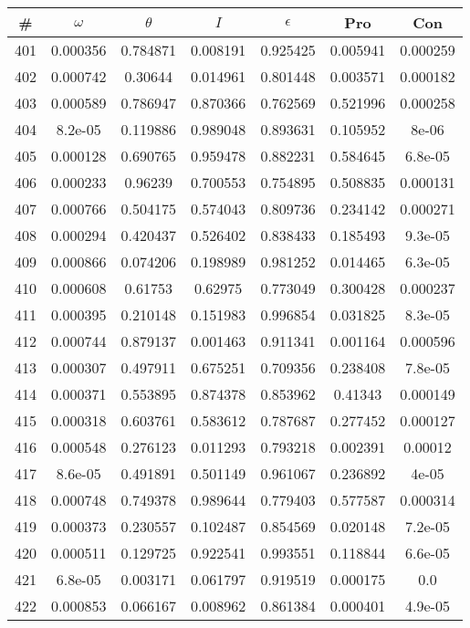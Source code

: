 \newpage
\begin{table}
\begin{tabular}{c|c|c|c|c|c|c}
\# & $\omega$ & $\theta$ & $I$ & $\epsilon$ & Pro & Con\\
\hline
401 & 0.000356 & 0.784871 & 0.008191 & 0.925425 & 0.005941 & 0.000259\\
402 & 0.000742 & 0.30644 & 0.014961 & 0.801448 & 0.003571 & 0.000182\\
403 & 0.000589 & 0.786947 & 0.870366 & 0.762569 & 0.521996 & 0.000258\\
404 & 8.2e-05 & 0.119886 & 0.989048 & 0.893631 & 0.105952 & 8e-06\\
405 & 0.000128 & 0.690765 & 0.959478 & 0.882231 & 0.584645 & 6.8e-05\\
406 & 0.000233 & 0.96239 & 0.700553 & 0.754895 & 0.508835 & 0.000131\\
407 & 0.000766 & 0.504175 & 0.574043 & 0.809736 & 0.234142 & 0.000271\\
408 & 0.000294 & 0.420437 & 0.526402 & 0.838433 & 0.185493 & 9.3e-05\\
409 & 0.000866 & 0.074206 & 0.198989 & 0.981252 & 0.014465 & 6.3e-05\\
410 & 0.000608 & 0.61753 & 0.62975 & 0.773049 & 0.300428 & 0.000237\\
411 & 0.000395 & 0.210148 & 0.151983 & 0.996854 & 0.031825 & 8.3e-05\\
412 & 0.000744 & 0.879137 & 0.001463 & 0.911341 & 0.001164 & 0.000596\\
413 & 0.000307 & 0.497911 & 0.675251 & 0.709356 & 0.238408 & 7.8e-05\\
414 & 0.000371 & 0.553895 & 0.874378 & 0.853962 & 0.41343 & 0.000149\\
415 & 0.000318 & 0.603761 & 0.583612 & 0.787687 & 0.277452 & 0.000127\\
416 & 0.000548 & 0.276123 & 0.011293 & 0.793218 & 0.002391 & 0.00012\\
417 & 8.6e-05 & 0.491891 & 0.501149 & 0.961067 & 0.236892 & 4e-05\\
418 & 0.000748 & 0.749378 & 0.989644 & 0.779403 & 0.577587 & 0.000314\\
419 & 0.000373 & 0.230557 & 0.102487 & 0.854569 & 0.020148 & 7.2e-05\\
420 & 0.000511 & 0.129725 & 0.922541 & 0.993551 & 0.118844 & 6.6e-05\\
421 & 6.8e-05 & 0.003171 & 0.061797 & 0.919519 & 0.000175 & 0.0\\
422 & 0.000853 & 0.066167 & 0.008962 & 0.861384 & 0.000401 & 4.9e-05\\

\end{tabular}
\end{table}
